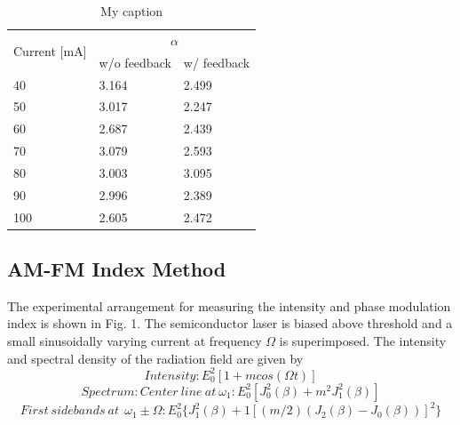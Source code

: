 \begin{table}[ht]
    \centering
    \caption{My caption}
    \label{my-label}
    \begin{tabular}{@{}lll@{}}
    \toprule
    \multirow{2}{*}{Current {[}mA{]}} & \multicolumn{2}{c}{$\alpha$} \\ \cmidrule(l){2-3} 
                                      & w/o feedback  & w/ feedback  \\ \midrule
    40                                & 3.164         & 2.499        \\
    50                                & 3.017         & 2.247        \\
    60                                & 2.687         & 2.439        \\
    70                                & 3.079         & 2.593        \\
    80                                & 3.003         & 3.095        \\
    90                                & 2.996         & 2.389        \\
    100                               & 2.605         & 2.472        \\ \bottomrule
    \end{tabular}
\end{table}

\subsection{AM-FM Index Method}
The experimental arrangement for measuring the intensity and phase modulation index is shown in Fig. 1. The semiconductor laser is biased above threshold and a small sinusoidally varying current at frequency $\Omega$ is superimposed. The intensity and spectral density of the radiation field are given by
\begin{equation}
    Intensity: E_0^2[1+mcos(\Omega t)]
\end{equation}
\begin{equation}
    Spectrum: Center \ line \ at \ \omega_1: E_0^2[J_0^2(\beta)+m^2J_1^2(\beta)]
    \label{eq:alpha_2}
\end{equation}
\begin{equation}
    First \ sidebands \ at \
    \ \omega_1 \pm \Omega: E_0^2\big\{J_1^2(\beta)+1[(m/2)(J_2(\beta)-J_0(\beta))]^2\big\}
    \label{eq:alpha_3}
\end{equation}

